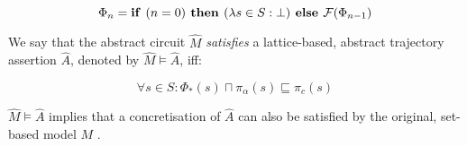 \begin{equation}
\Phi_{n} = \textrm{\textbf{if }} (n = 0) \textrm{\textbf{ then }} (\lambda s \in S : \bot) \textrm{\textbf{ else }} \mathcal{F}(\Phi_{n-1})
\end{equation}

We say that the abstract circuit $\hat M$ \textit{satisfies} a lattice-based, abstract trajectory assertion $\hat A$, denoted by $\hat M \models \hat A$, iff:

\begin{equation}
\forall s \in S : \Phi_{*}(s) \sqcap \pi_{\alpha}(s) \sqsubseteq \pi_{c}(s)
\end{equation}

\noindent $\hat M \models \hat A$ implies that a concretisation of $\hat A$ can also be satisfied by the original, set-based model $M$ \cite{chou1999}.
